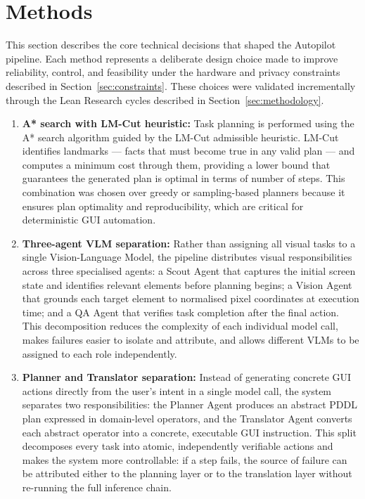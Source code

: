 \section{Methods}

This section describes the core technical decisions that shaped the Autopilot pipeline. Each method represents a deliberate design choice made to improve reliability, control, and feasibility under the hardware and privacy constraints described in Section~\ref{sec:constraints}. These choices were validated incrementally through the Lean Research cycles described in Section~\ref{sec:methodology}.

\begin{enumerate}

  \item \textbf{A* search with LM-Cut heuristic:} Task planning is performed using the A* search algorithm guided by the LM-Cut admissible heuristic. LM-Cut identifies landmarks — facts that must become true in any valid plan — and computes a minimum cost through them, providing a lower bound that guarantees the generated plan is optimal in terms of number of steps. This combination was chosen over greedy or sampling-based planners because it ensures plan optimality and reproducibility, which are critical for deterministic GUI automation.

  \item \textbf{Three-agent VLM separation:} Rather than assigning all visual tasks to a single Vision-Language Model, the pipeline distributes visual responsibilities across three specialised agents: a Scout Agent that captures the initial screen state and identifies relevant elements before planning begins; a Vision Agent that grounds each target element to normalised pixel coordinates at execution time; and a QA Agent that verifies task completion after the final action. This decomposition reduces the complexity of each individual model call, makes failures easier to isolate and attribute, and allows different VLMs to be assigned to each role independently.

  \item \textbf{Planner and Translator separation:} Instead of generating concrete GUI actions directly from the user's intent in a single model call, the system separates two responsibilities: the Planner Agent produces an abstract PDDL plan expressed in domain-level operators, and the Translator Agent converts each abstract operator into a concrete, executable GUI instruction. This split decomposes every task into atomic, independently verifiable actions and makes the system more controllable: if a step fails, the source of failure can be attributed either to the planning layer or to the translation layer without re-running the full inference chain.

\end{enumerate}

